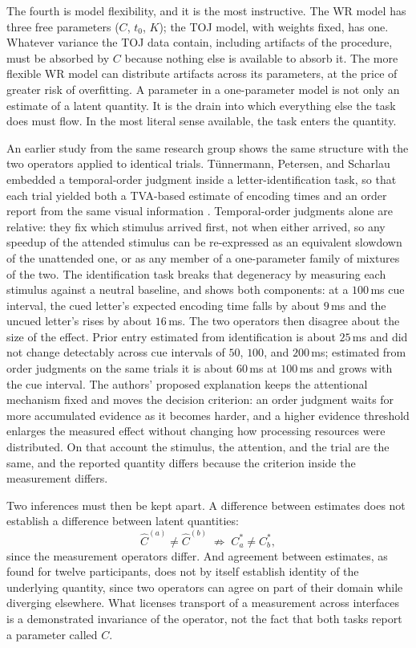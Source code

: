 \documentclass[11pt]{article}
\theoremstyle{definition}
\theoremstyle{remark}
\begin{document}
The fourth is model flexibility, and it is the most instructive. The WR model has three free parameters ($C$, $t_0$, $K$); the TOJ model, with weights fixed, has one. Whatever variance the TOJ data contain, including artifacts of the procedure, must be absorbed by $C$ because nothing else is available to absorb it. The more flexible WR model can distribute artifacts across its parameters, at the price of greater risk of overfitting. A parameter in a one-parameter model is not only an estimate of a latent quantity. It is the drain into which everything else the task does must flow. In the most literal sense available, the task enters the quantity.

An earlier study from the same research group shows the same structure with the two operators applied to identical trials. Tünnermann, Petersen, and Scharlau embedded a temporal-order judgment inside a letter-identification task, so that each trial yielded both a TVA-based estimate of encoding times and an order report from the same visual information \cite{tunnermann2015}. Temporal-order judgments alone are relative: they fix which stimulus arrived first, not when either arrived, so any speedup of the attended stimulus can be re-expressed as an equivalent slowdown of the unattended one, or as any member of a one-parameter family of mixtures of the two. The identification task breaks that degeneracy by measuring each stimulus against a neutral baseline, and shows both components: at a $100$\,ms cue interval, the cued letter's expected encoding time falls by about $9$\,ms and the uncued letter's rises by about $16$\,ms. The two operators then disagree about the size of the effect. Prior entry estimated from identification is about $25$\,ms and did not change detectably across cue intervals of $50$, $100$, and $200$\,ms; estimated from order judgments on the same trials it is about $60$\,ms at $100$\,ms and grows with the cue interval. The authors' proposed explanation keeps the attentional mechanism fixed and moves the decision criterion: an order judgment waits for more accumulated evidence as it becomes harder, and a higher evidence threshold enlarges the measured effect without changing how processing resources were distributed. On that account the stimulus, the attention, and the trial are the same, and the reported quantity differs because the criterion inside the measurement differs.

Two inferences must then be kept apart. A difference between estimates does not establish a difference between latent quantities:
\begin{equation}
\hat{C}^{(a)} \neq \hat{C}^{(b)} \;\not\Rightarrow\; C^\ast_a \neq C^\ast_b,
\end{equation}
since the measurement operators differ. And agreement between estimates, as found for twelve participants, does not by itself establish identity of the underlying quantity, since two operators can agree on part of their domain while diverging elsewhere. What licenses transport of a measurement across interfaces is a demonstrated invariance of the operator, not the fact that both tasks report a parameter called $C$.
\end{document}
